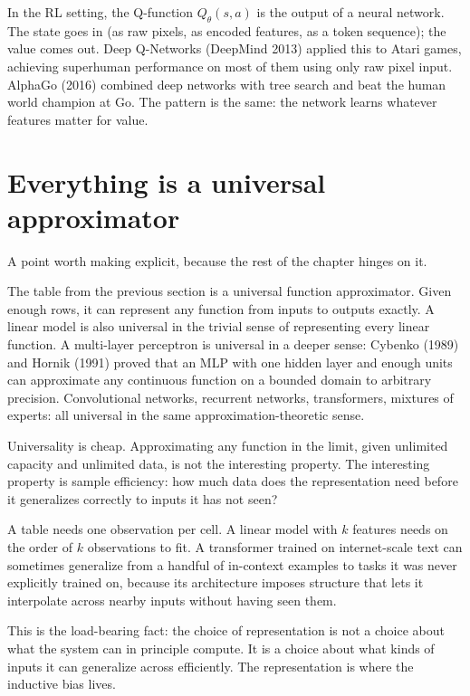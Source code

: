 In the RL setting, the Q-function $Q_\theta(s, a)$ is the output of a neural network. The state goes in (as raw pixels, as encoded features, as a token sequence); the value comes out. Deep Q-Networks (DeepMind 2013) applied this to Atari games, achieving superhuman performance on most of them using only raw pixel input. AlphaGo (2016) combined deep networks with tree search and beat the human world champion at Go. The pattern is the same: the network learns whatever features matter for value.

\section*{Everything is a universal approximator}

A point worth making explicit, because the rest of the chapter hinges on it.

The table from the previous section is a universal function approximator. Given enough rows, it can represent any function from inputs to outputs exactly. A linear model is also universal in the trivial sense of representing every linear function. A multi-layer perceptron is universal in a deeper sense: Cybenko (1989) and Hornik (1991) proved that an MLP with one hidden layer and enough units can approximate any continuous function on a bounded domain to arbitrary precision. Convolutional networks, recurrent networks, transformers, mixtures of experts: all universal in the same approximation-theoretic sense.

Universality is cheap. Approximating any function in the limit, given unlimited capacity and unlimited data, is not the interesting property. The interesting property is sample efficiency: how much data does the representation need before it generalizes correctly to inputs it has not seen?

A table needs one observation per cell. A linear model with $k$ features needs on the order of $k$ observations to fit. A transformer trained on internet-scale text can sometimes generalize from a handful of in-context examples to tasks it was never explicitly trained on, because its architecture imposes structure that lets it interpolate across nearby inputs without having seen them.

This is the load-bearing fact: the choice of representation is not a choice about what the system can in principle compute. It is a choice about what kinds of inputs it can generalize across efficiently. The representation is where the inductive bias lives.

